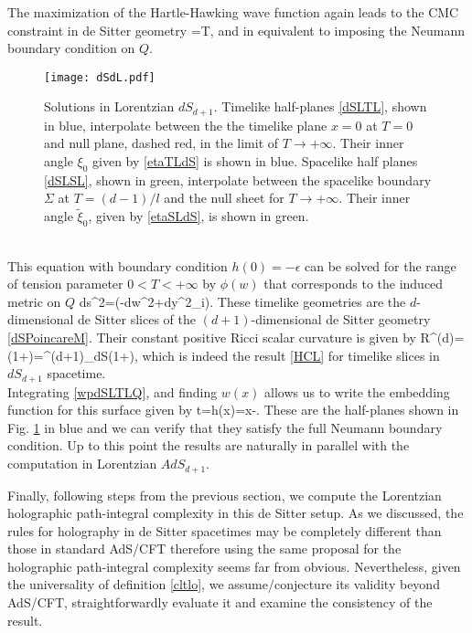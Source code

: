 \documentclass[a4paper,12pt]{article}
\begin{document}
The maximization of the Hartle-Hawking wave function again leads to the CMC constraint in de Sitter geometry
\be
{}=T,
\ee
and in equivalent to imposing the Neumann boundary condition on $Q$.
   \begin{figure}[b!]
  \centering
  \texttt{[image: dSdL.pdf]}
  \caption{Solutions in Lorentzian $dS_{d+1}$.  Timelike half-planes \eqref{dSLTL}, shown in blue, interpolate between the  the timelike plane $x=0$ at $T=0$ and null plane, dashed red, in the limit of $T\to+\infty$. Their inner angle $\xi_0$ given by \eqref{etaTLdS} is shown in blue. Spacelike half planes \eqref{dSLSL}, shown in green, interpolate between the spacelike boundary $\Sigma$ at $T=(d-1)/l$ and the null sheet for $T\to+\infty$. Their inner angle $\tilde{\xi}_0$, given by \eqref{etaSLdS}, is shown in green.}
\label{SolLordS}
\end{figure}\\

This equation with boundary condition $h(0)=-\epsilon$ can be solved for the range of tension parameter $0<T<+\infty$ by $\phi(w)$ that corresponds to the induced metric on $Q$ 
 \be
 ds^2=\left(-dw^2+dy^2_i\right).\label{SolutiondST}
 \ee
 These timelike geometries are the $d$-dimensional de Sitter slices of the $(d+1)$-dimensional de Sitter geometry \eqref{dSPoincareM}. Their constant positive Ricci scalar curvature is given by
\be
R^{(d)}=\left(1+\right)=\Lambda^{(d+1)}_{dS}\left(1+\right),
\ee
which is indeed the result \eqref{HCL} for timelike slices in $dS_{d+1}$ spacetime.\\
Integrating \eqref{wpdSLTLQ}, and finding $w(x)$ allows us to write  the embedding function for this surface given by
 \be
 t=h(x)=x-\epsilon.
 \label{dSLTL}
 \ee
 These are the half-planes shown in Fig. \ref{SolLordS} in blue and we can verify that they satisfy the full Neumann boundary condition. Up to this point the results are naturally in parallel with the computation in Lorentzian $AdS_{d+1}$.

Finally, following steps from the previous section, we compute the Lorentzian holographic path-integral complexity in this de Sitter setup. As we discussed, the rules for holography in de Sitter spacetimes may be completely different than those in standard AdS/CFT therefore using the same proposal for the holographic path-integral complexity seems far from obvious. Nevertheless, given the universality of definition \eqref{cltlo}, we assume/conjecture its validity beyond AdS/CFT, straightforwardly evaluate it and examine the consistency of the result.
\end{document}

